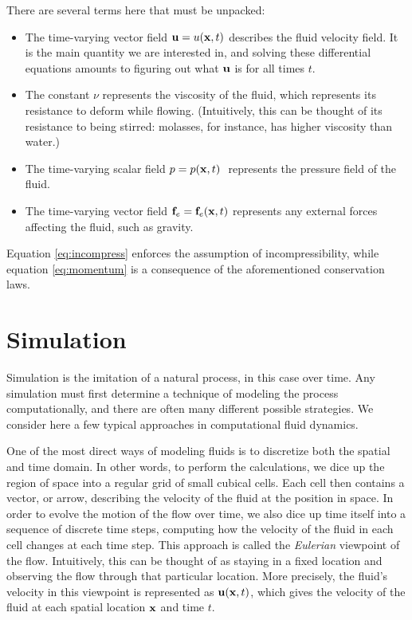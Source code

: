 There are several terms here that must be unpacked:

\begin{itemize}
\item The time-varying vector field $\mathbf{u} = u(\mathbf{x}, t)$ describes the fluid velocity field. It is the main quantity we are interested in, and solving these differential equations amounts to figuring out what $\mathbf{u}$ is for all times $t$.
\item The constant $\nu$ represents the viscosity of the fluid, which represents its resistance to deform while flowing. (Intuitively, this can be thought of its resistance to being stirred: molasses, for instance, has higher viscosity than water.) 
\item The time-varying scalar field $p = p(\mathbf{x}, t)\ $ represents the pressure field of the fluid. 
\item The time-varying vector field $\mathbf{f}_e = \mathbf{f}_e(\mathbf{x}, t)$ represents any external forces affecting the fluid, such as gravity.
\end{itemize}
Equation \ref{eq:incompress} enforces the assumption of incompressibility, while equation \ref{eq:momentum} is a consequence of the aforementioned conservation laws.

\section{Simulation}

Simulation is the imitation of a natural process, in this case over time. Any simulation must first determine a technique of modeling the process computationally, and there are often many different possible strategies. We consider here a few typical approaches in computational fluid dynamics.

One of the most direct ways of modeling fluids is to discretize both the spatial and time domain. In other words, to perform the calculations, we dice up the region of space into a regular grid of small cubical cells. Each cell then contains a vector, or arrow, describing the velocity of the fluid at the position in space. In order to evolve the motion of the flow over time, we also dice up time itself into a sequence of discrete time steps, computing how the velocity of the fluid in each cell changes at each time step. This approach is called the {\em Eulerian} viewpoint of the flow. Intuitively, this can be thought of as staying in a fixed location and observing the flow through that particular location. More precisely, the fluid's velocity in this viewpoint is represented as $\mathbf{u}(\mathbf{x}, t)$, which gives the velocity of the fluid at each spatial location $\mathbf{x}$ and time $t$.

